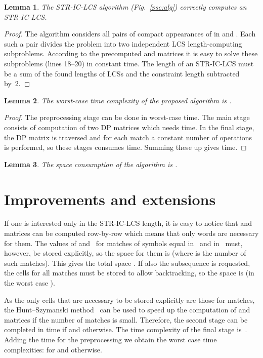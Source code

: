 \documentclass[12pt]{article}
\newtheorem{lemma}{Lemma}
\begin{document}
\begin{lemma}
The STR-IC-LCS algorithm (Fig.~\ref{psc:alg}) correctly computes an STR-IC-LCS.
\end{lemma}

\begin{proof}
The algorithm considers all pairs of compact appearances of  in  and .
Each such a pair divides the problem into two independent LCS length-computing subproblems.
According to the precomputed  and  matrices it is easy to solve these subproblems (lines 18--20) in constant time.
The length of an STR-IC-LCS must be a sum of the found lengths of LCSs and the constraint length subtracted by~2.
\end{proof}

\begin{lemma}
The worst-case time complexity of the proposed algorithm is .
\end{lemma}

\begin{proof}
The preprocessing stage can be done in  worst-case time.
The main stage consists of computation of two DP matrices which needs  time.
In the final stage, the DP matrix is traversed and for each match a constant number of operations is performed, so these stages consumes  time.
Summing these up gives  time.
\end{proof}

\begin{lemma}
The space consumption of the algorithm is .
\end{lemma}



\section{Improvements and extensions}
\label{sec:impr}
If one is interested only in the STR-IC-LCS length, it is easy to notice that  and  matrices can be computed row-by-row which means that only  words are necessary for them.
The values of  and~ for matches of symbols equal  in~ and  in~ must, however, be stored explicitly, so the space for them is  (where  is the number of such matches).
This gives the total space .
If also the subsequence is requested, the cells for all matches must be stored to allow backtracking, so the space is  (in the worst case ).


As the only cells that are necessary to be stored explicitly are those for matches, the Hunt--Szymanski method~\cite{Gus1997} can be used to speed up the computation of  and  matrices if the number of matches is small.
Therefore, the second stage can be completed in  time if  and  otherwise.
The time complexity of the final stage is~.
Adding the time for the preprocessing we obtain the worst case time complexities:
 for  and  otherwise.
\end{document}
